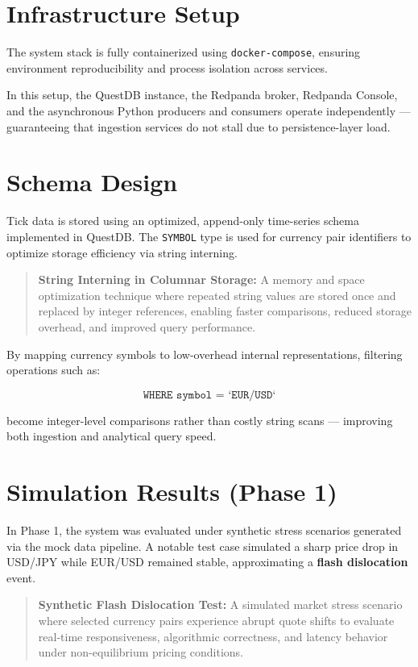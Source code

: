 \documentclass[letterpaper,11pt]{report}
\begin{document}
\section{Infrastructure Setup}

The system stack is fully containerized using \texttt{docker-compose}, ensuring environment reproducibility and process isolation across services.  

In this setup, the QuestDB instance, the Redpanda broker, Redpanda Console, and the asynchronous Python producers and consumers operate independently — guaranteeing that ingestion services do not stall due to persistence-layer load.

\section{Schema Design}

Tick data is stored using an optimized, append-only time-series schema implemented in QuestDB. The \texttt{SYMBOL} type is used for currency pair identifiers to optimize storage efficiency via string interning.

\begin{quote}
\textbf{String Interning in Columnar Storage:}  
A memory and space optimization technique where repeated string values are stored once and replaced by integer references, enabling faster comparisons, reduced storage overhead, and improved query performance.
\end{quote}

By mapping currency symbols to low-overhead internal representations, filtering operations such as:

\[
\texttt{WHERE symbol = `EUR/USD`}
\]

become integer-level comparisons rather than costly string scans — improving both ingestion and analytical query speed.


\section{Simulation Results (Phase 1)}

In Phase 1, the system was evaluated under synthetic stress scenarios generated via the mock data pipeline. A notable test case simulated a sharp price drop in USD/JPY while EUR/USD remained stable, approximating a \textbf{flash dislocation} event.

\begin{quote}
\textbf{Synthetic Flash Dislocation Test:}  
A simulated market stress scenario where selected currency pairs experience abrupt quote shifts to evaluate real-time responsiveness, algorithmic correctness, and latency behavior under non-equilibrium pricing conditions.
\end{quote}
\end{document}
